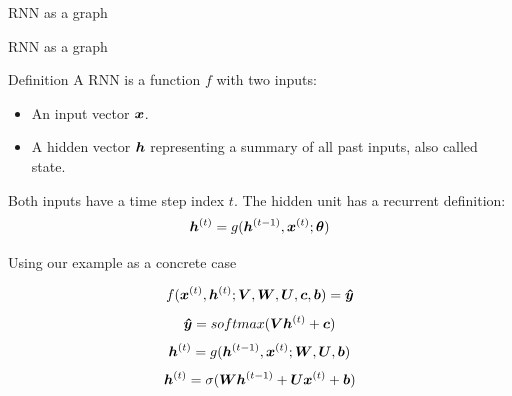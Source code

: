 \documentclass[10pt]{beamer}
\begin{document}
\begin{frame}{RNN as a graph}

\end{frame}

\begin{frame}{RNN as a graph}

\end{frame}


\begin{frame}{Definition}
A RNN is a function $f$ with two inputs:
\vspace{0.2cm}
\begin{itemize}
\item An input vector $\bm{x}$.
\vspace{0.1cm}
\item A hidden vector $\bm{h}$ representing a summary of all past inputs, also called \alert{state}.
\end{itemize}

\vspace{0.2cm}
Both inputs have a time step index $t$. The hidden unit has a recurrent definition:
\vspace{0.2cm}
\Large{
\begin{equation*}
\bm{h}^{(t)} = g(\bm{h}^{(t-1)}, \bm{x}^{(t)}; \bm{\theta})
\end{equation*}
}
\end{frame}


\begin{frame}{Using our example as a concrete case}

\Large{
 \vspace{0.2cm}
\begin{equation*}
f(\bm{x}^{(t)}, \bm{h}^{(t)}; \bm{V}, \bm{W}, \bm{U}, \bm{c}, \bm{b}) = \bm{\hat{y}}
\end{equation*}
 \vspace{0.2cm}
\begin{equation*}
\bm{\hat{y}} = softmax(\bm{V} \bm{h}^{(t)} + \bm{c})
\end{equation*}
\vspace{0.2cm}
 \begin{equation*}
\bm{h}^{(t)} = g(\bm{h}^{(t-1)}, \bm{x}^{(t)}; \bm{W},\bm{U}, \bm{b})
\end{equation*}
\vspace{0.2cm}
\begin{equation*}
\bm{h}^{(t)} = \sigma(\bm{W} \bm{h}^{(t-1)} + \bm{U} \bm{x}^{(t)} + \bm{b})
\end{equation*}
}

\end{frame}
\end{document}
